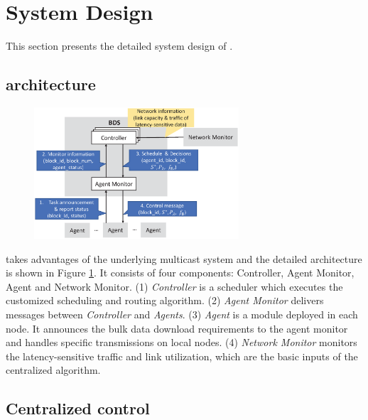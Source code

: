 \section{System Design}
\label{sec:system}

This section presents the detailed system design of \name.%

\subsection{\name architecture}
\label{subsec:system:architecture}

\begin{figure}[t]
  \centering
  \includegraphics[width=3in]{images/implementation_v2.eps}
  \label{fig:implementation}
\vspace{-0.4cm}
\end{figure}

\name takes advantages of the underlying multicast system and the detailed architecture is shown in Figure \ref{fig:implementation}. It consists of four components: Controller, Agent Monitor, Agent and Network Monitor. (1) \emph{Controller} is a scheduler which executes the customized scheduling and routing algorithm. (2) \emph{Agent Monitor} delivers messages between \emph{Controller} and \emph{Agents}. (3) \emph{Agent} is a module deployed in each node. It announces the bulk data download requirements to the agent monitor and handles specific transmissions on local nodes. (4) \emph{Network Monitor} monitors the latency-sensitive traffic and link utilization, which are the basic inputs of the centralized algorithm.

\subsection{Centralized control}
\label{subsec:system:centralized}

